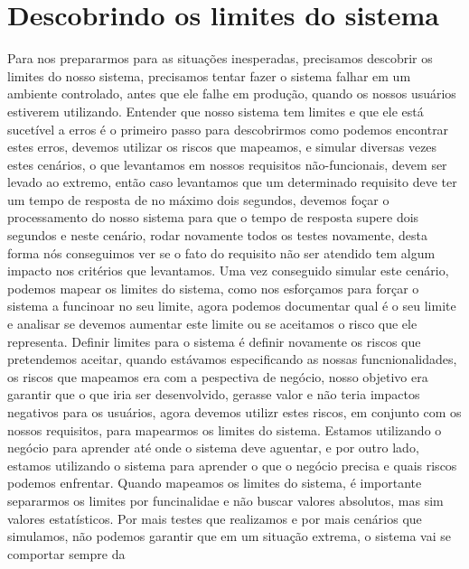     \section{Descobrindo os limites do sistema}
      Para nos prepararmos para as situações inesperadas, precisamos descobrir os
      limites do nosso sistema, precisamos tentar fazer o sistema falhar em um
      ambiente controlado, antes que ele falhe em produção, quando os nossos usuários
      estiverem utilizando. Entender que nosso sistema tem limites e que ele está
      sucetível a erros é o primeiro passo para descobrirmos como podemos encontrar
      estes erros, devemos utilizar os riscos que mapeamos, e simular diversas vezes
      estes cenários, o que levantamos em nossos requisitos não-funcionais, devem
      ser levado ao extremo, então caso levantamos que um determinado requisito
      deve ter um tempo de resposta de no máximo dois segundos, devemos foçar o
      processamento do nosso sistema para que o tempo de resposta supere dois segundos
      e neste cenário, rodar novamente todos os testes novamente, desta forma nós
      conseguimos ver se o fato do requisito não ser atendido tem algum impacto nos
      critérios que levantamos. Uma vez conseguido simular este cenário, podemos
      mapear os limites do sistema, como nos esforçamos para forçar o sistema a
      funcinoar no seu limite, agora podemos documentar qual é o seu limite e
      analisar se devemos aumentar este limite ou se aceitamos o risco que ele
      representa. \newline
      Definir limites para o sistema é definir novamente os riscos que pretendemos
      aceitar, quando estávamos especificando as nossas funcnionalidades, os riscos
      que mapeamos era com a pespectiva de negócio, nosso objetivo era garantir que
      o que iria ser desenvolvido, gerasse valor e não teria impactos negativos para
      os usuários, agora devemos utilizr estes riscos, em conjunto com os nossos
      requisitos, para mapearmos os limites do sistema. Estamos utilizando o negócio
      para aprender até onde o sistema deve aguentar, e por outro lado, estamos
      utilizando o sistema para aprender o que o negócio precisa e quais riscos
      podemos enfrentar. \newline
      Quando mapeamos os limites do sistema, é importante separarmos os limites por
      funcinalidae e não buscar valores absolutos, mas sim valores estatísticos.
      Por mais testes que realizamos e por mais cenários que simulamos, não podemos
      garantir que em um situação extrema, o sistema vai se comportar sempre da

